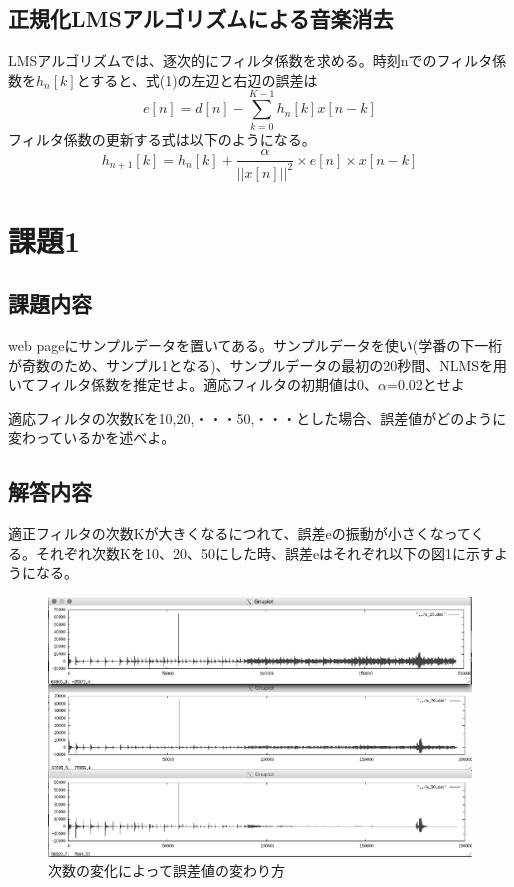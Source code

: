 \documentclass[a4j,12]{jarticle}
\begin{document}
       \subsection{正規化LMSアルゴリズムによる音楽消去}
       LMSアルゴリズムでは、逐次的にフィルタ係数を求める。時刻nでのフィルタ係数を$h_n[k]$とすると、式(1)の左辺と右辺の誤差は
       \begin{equation}
         e[n]=d[n]-\sum_{k=0}^{K-1}h_n[k]x[n-k]
       \end{equation}
       フィルタ係数の更新する式は以下のようになる。
       \begin{equation}
         h_{n+1}[k]=h_n[k]+ \frac{\alpha}{||x[n]||^2}×e[n]×x[n-k]
       \end{equation}


       \section{課題1}
       \subsection{課題内容}
              web pageにサンプルデータを置いてある。サンプルデータを使い(学番の下一桁が奇数のため、サンプル1となる)、サンプルデータの最初の20秒間、NLMSを用いてフィルタ係数を推定せよ。適応フィルタの初期値は0、$\alpha$=0.02とせよ \par
       適応フィルタの次数Kを10,20,・・・50,・・・とした場合、誤差値がどのように変わっているかを述べよ。
       \subsection{解答内容}
       適正フィルタの次数Kが大きくなるにつれて、誤差eの振動が小さくなってくる。それぞれ次数Kを10、20、50にした時、誤差eはそれぞれ以下の図1に示すようになる。
       \begin{figure}[htpb]
         \begin{center}
           \includegraphics[width=15cm]{e.eps}%
           \caption{次数の変化によって誤差値の変わり方}
           \label{micon}
         \end{center}
       \end{figure}
       
\end{document}
